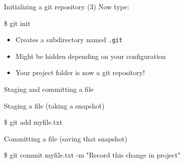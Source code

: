 \documentclass[handout]{beamer}
\begin{document}
\begin{frame}{Initializing a git repository (3)}
	Now type:
	\begin{exampleblock}{}
		\begin{semiverbatim}
			\item \$ git init
		\end{semiverbatim}
	\end{exampleblock}
	\begin{itemize}
		\item Creates a subdirectory named \texttt{.git}
		\item Might be hidden depending on your configuration
		\item Your project folder is now a git repository!
	\end{itemize}
\end{frame}

\begin{frame}{Staging and committing a file}
	\begin{exampleblock}{Staging a file (taking a snapshot)}
		\begin{semiverbatim}
			\item \$ git add myfile.txt
		\end{semiverbatim}
	\end{exampleblock}
	\begin{exampleblock}{Committing a file (saving that snapshot)}
		\begin{semiverbatim}
			\item \$ git commit myfile.txt -m "Record this change in project"
		\end{semiverbatim}
	\end{exampleblock}
\end{frame}
\end{document}
